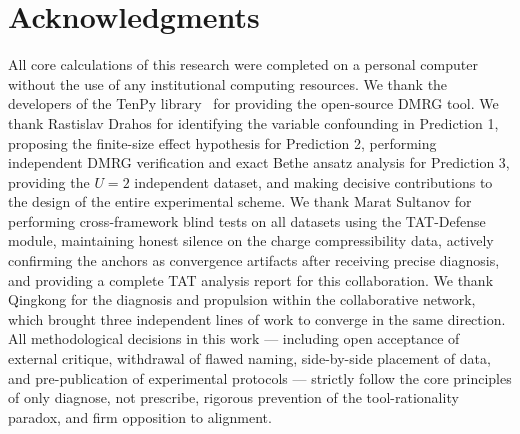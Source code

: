 \documentclass[prb,reprint,twocolumn,superscriptaddress]{revtex4-2}
\begin{document}
\section*{Acknowledgments}

All core calculations of this research were completed on a personal computer without the use of any institutional computing resources. We thank the developers of the TenPy library~\cite{Hauschild2018} for providing the open-source DMRG tool. We thank Rastislav Drahos for identifying the variable confounding in Prediction 1, proposing the finite-size effect hypothesis for Prediction 2, performing independent DMRG verification and exact Bethe ansatz analysis for Prediction 3, providing the $U=2$ independent dataset, and making decisive contributions to the design of the entire experimental scheme. We thank Marat Sultanov for performing cross-framework blind tests on all datasets using the TAT-Defense module, maintaining honest silence on the charge compressibility data, actively confirming the anchors as convergence artifacts after receiving precise diagnosis, and providing a complete TAT analysis report for this collaboration. We thank Qingkong for the diagnosis and propulsion within the collaborative network, which brought three independent lines of work to converge in the same direction. All methodological decisions in this work --- including open acceptance of external critique, withdrawal of flawed naming, side-by-side placement of data, and pre-publication of experimental protocols --- strictly follow the core principles of only diagnose, not prescribe, rigorous prevention of the tool-rationality paradox, and firm opposition to alignment.
\end{document}
